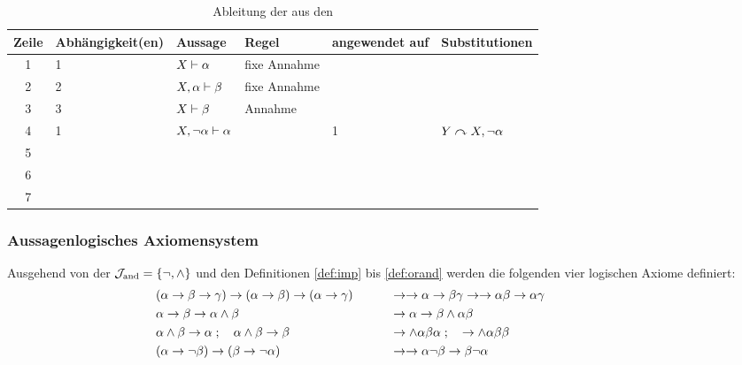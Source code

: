 \begin{table}[!htb]
	\begin{tabular}{|c|l|l|l|l|l|}
		\hline
		\rule[-1ex]{0pt}{2.5ex} \textbf{Zeile} & \textbf{Abhängigkeit(en)} & \textbf{Aussage} & \textbf{Regel} & \textbf{angewendet auf} & \textbf{Substitutionen} \\
		\hline
		\rule[-1ex]{0pt}{2.5ex} 1 & 1 & $ X      \vdash\alpha $ & fixe Annahme && \\
		\hline
		\rule[-1ex]{0pt}{2.5ex} 2 & 2 & $ X,\alpha\vdash\beta $ & fixe Annahme && \\
		\hline
		\rule[-1ex]{0pt}{2.5ex} 3 & 3 & $ X       \vdash\beta $ & Annahme      && \\
		\hline
		\rule[-1ex]{0pt}{2.5ex} 4 & 1 & $ X,\lnot\alpha\vdash\alpha $ & \glsIdxPl{MR} & 1 & $ Y \curvearrowright X,\lnot\alpha $ \\
		\hline
		\rule[-1ex]{0pt}{2.5ex} 5 &  &  &  &  &  \\
		\hline
		\rule[-1ex]{0pt}{2.5ex} 6 &  &  &  &  &  \\
		\hline
		\rule[-1ex]{0pt}{2.5ex} 7 &  &  &  &  &  \\
		\hline
	\end{tabular}
	\caption{Ableitung der  aus den }
\end{table}

\subsubsection{Aussagenlogisches Axiomensystem}%
\label{subsub:ausAxiome}

Ausgehend von der  $\mathcal{J}_{\mathrm{and}} = \{\lnot, \land\}$ und den Definitionen \eqref{def:imp} bis \eqref{def:orand} werden die folgenden vier logischen Axiome definiert:
\begin{align}
	&
	(\alpha\rightarrow\beta\rightarrow\gamma)\rightarrow(\alpha\rightarrow\beta)\rightarrow(\alpha\rightarrow\gamma)
	&&&& &
	& \rightarrow\rightarrow\alpha\rightarrow\beta\gamma\rightarrow\rightarrow\alpha\beta\rightarrow\alpha\gamma \\
	& \alpha \rightarrow \beta \rightarrow \alpha \land \beta
	&&&& &
	& \rightarrow \alpha \rightarrow \beta \land \alpha \beta \\
	& \alpha \land \beta \rightarrow \alpha \;; \quad \alpha \land \beta \rightarrow \beta
	&&&& &
	& \rightarrow \land \alpha \beta \alpha \;; \quad \rightarrow \land \alpha \beta \beta\\
	&(\alpha \rightarrow \lnot \beta) \rightarrow (\beta \rightarrow \lnot \alpha)
	&&&& &
	& \rightarrow \rightarrow \alpha \lnot \beta \rightarrow \beta \lnot \alpha
	&&&&&&&&&&
\end{align}

